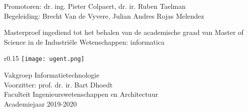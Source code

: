 \begin{titlepage}
{\ugentfont

  \vspace*{0.37\textheight}

  \begin{huge}

    \thetitle

    \theauthor

  \end{huge}

  \vspace{3.5cm}

  \begin{Large}
    Promotoren: dr. ing. Pieter Colpaert, dr. ir. Ruben Taelman\\
    Begeleiding: Brecht Van de Vyvere, Julian Andres Rojas Melendez

    Masterproef ingediend tot het behalen van de academische graad van Master of Science in de Industriële Wetenschappen: informatica
  \end{Large}

  \vspace{1cm}

  \begin{Large}
    \begin{wrapfigure}{r}{0.15\textwidth}
      \texttt{[image: ugent.png]}
    \end{wrapfigure}

    Vakgroep Informatietechnologie\\
    Voorzitter: prof. dr. ir. Bart Dhoedt\\
    Faculteit Ingenieurswetenschappen en Architectuur\\
    Academiejaar 2019-2020
  \end{Large}
}
\end{titlepage}
